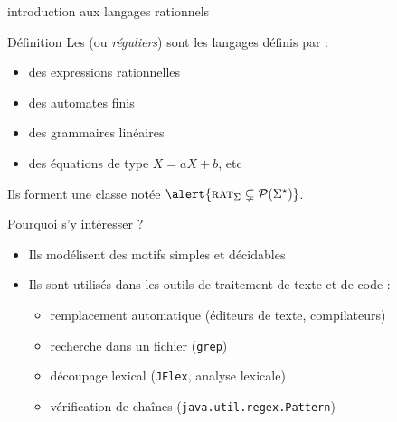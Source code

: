
\begingroup

\begin{frame}{introduction aux langages rationnels}
  \begin{block}{Définition}
    Les  (ou \emph{réguliers}) sont les langages définis par :
    \begin{itemize}
      \item des expressions rationnelles
      \item des automates finis
      \item des grammaires linéaires
      \item des équations de type $X = aX + b$, etc
    \end{itemize}
    Ils forment une classe notée $\alert{\textsc{rat}_\Sigma \subsetneq \mathcal{P}(\Sigma^\star)}$.
  \end{block}

  \begin{block}{Pourquoi s’y intéresser ?}
    \begin{itemize}
      \item Ils modélisent des motifs simples et décidables
      \item Ils sont utilisés dans les outils de traitement de texte et de code :
        \begin{itemize}
          \item remplacement automatique (éditeurs de texte, compilateurs)
          \item recherche dans un fichier (\texttt{grep})
          \item découpage lexical (\texttt{JFlex}, analyse lexicale)
          \item vérification de chaînes (\texttt{java.util.regex.Pattern})
        \end{itemize}
    \end{itemize}
  \end{block}
\end{frame}

\endgroup
